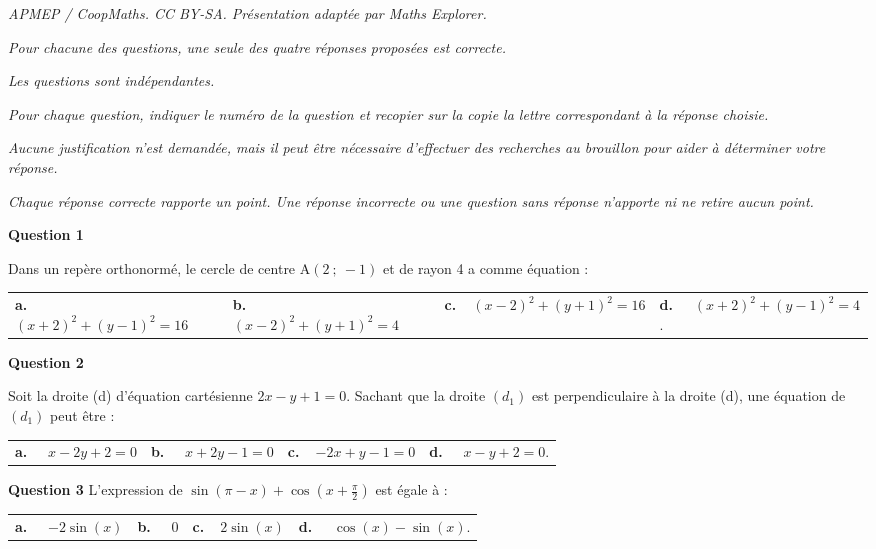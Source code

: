 \documentclass[10pt]{article}
\begin{document}
\noindent\textit{APMEP / CoopMaths. CC BY-SA. Présentation adaptée par Maths Explorer.}\par\medskip
\medskip


\emph{Pour chacune des questions, une seule des quatre réponses proposées est correcte.}

\emph{Les questions sont indépendantes.}

\emph{Pour chaque question, indiquer le numéro de la question et recopier sur la copie la lettre correspondant à la réponse choisie.}

\emph{Aucune justification n'est demandée, mais il peut être nécessaire d'effectuer des recherches au brouillon pour aider à déterminer votre réponse.}

\emph{Chaque réponse correcte rapporte un point. Une réponse incorrecte ou une question sans réponse n'apporte ni ne retire aucun point.}

\medskip

\textbf{Question 1}

\medskip 

Dans un repère orthonormé, le cercle de centre A$(2~;~-1)$ et de rayon 4 a comme équation :

\medskip

\begin{tabularx}{\linewidth}{*{4}{X}}
\textbf{a.~~} $(x+2)^2+(y-1)^2=16$ &\textbf{b.~~} $(x-2)^2+(y+1)^2=4$&\textbf{c.~~}$(x-2)^2+(y+1)^2=16$& \textbf{d.~~} $(x+2)^2+(y-1)^2=4$.
\end{tabularx}

\medskip
\textbf{Question 2}
\medskip 

Soit la droite (d) d'équation cartésienne $2x-y+1 = 0$.
Sachant que la droite $(d_1)$ est perpendiculaire à la droite (d), une équation de $(d_1)$
 peut être :

\begin{tabularx}{\linewidth}{*{4}{X}}
\textbf{a.~~} $x-2y+2 = 0$ &\textbf{b.~~} $x+2y-1 = 0$&\textbf{c.~~}$-2x+y-1 = 0$& \textbf{d.~~} $x-y+2 = 0$.
\end{tabularx}

\medskip
\textbf{Question 3}
\medskip 
L'expression de $\sin(\pi- x)+\cos \left(x+ \frac{\pi}{2}\right)$ est égale à :


\begin{tabularx}{\linewidth}{*{4}{X}}
\textbf{a.~~} $-2\sin(x)$ &\textbf{b.~~} $0$&\textbf{c.~~}$2\sin(x)$& \textbf{d.~~} $\cos(x)-\sin (x)$.
\end{tabularx}
\end{document}
